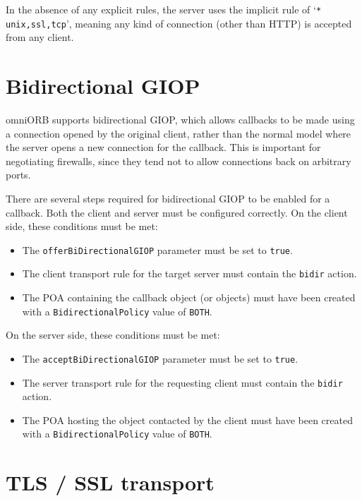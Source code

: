 \documentclass[11pt,oneside,a4paper]{book}
\newcommand{\code}[1]{\texttt{#1}}
\newcommand{\dsc}{\discretionary{}{}{}}
\begin{document}
\noindent In the absence of any explicit rules, the server uses the
implicit rule of `\code{* unix,\dsc{}ssl,tcp}', meaning any kind of
connection (other than HTTP) is accepted from any client.


\section{Bidirectional GIOP}
\label{sec:bidir}

omniORB supports bidirectional GIOP, which allows callbacks to be made
using a connection opened by the original client, rather than the
normal model where the server opens a new connection for the callback.
This is important for negotiating firewalls, since they tend not to
allow connections back on arbitrary ports.

There are several steps required for bidirectional GIOP to be enabled
for a callback. Both the client and server must be configured
correctly. On the client side, these conditions must be met:

\begin{itemize}

\item The \code{offerBiDirectionalGIOP} parameter must be set to \code{true}. 
\item The client transport rule for the target server must contain the
      \code{bidir} action.
\item The POA containing the callback object (or objects) must have
      been created with a \code{BidirectionalPolicy} value of
      \code{BOTH}.

\end{itemize}

\noindent On the server side, these conditions must be met:

\begin{itemize}

\item The \code{acceptBiDirectionalGIOP} parameter must be set to \code{true}. 
\item The server transport rule for the requesting client must contain
      the \code{bidir} action.
\item The POA hosting the object contacted by the client must have
      been created with a \code{BidirectionalPolicy} value of
      \code{BOTH}.

\end{itemize}


\section{TLS / SSL transport}
\end{document}
